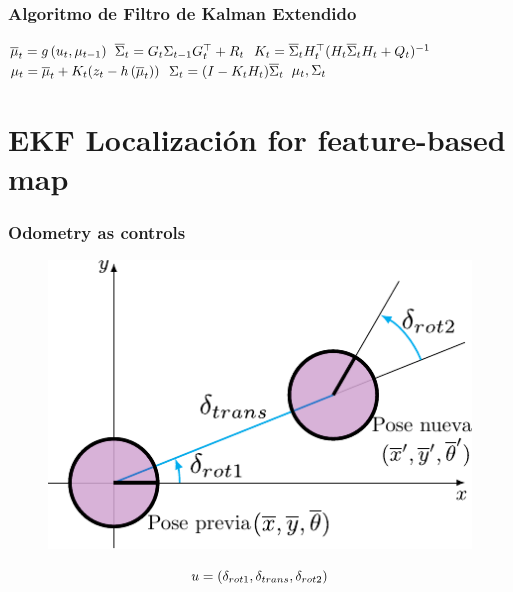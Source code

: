 \begin{frame}
    \frametitle{Algoritmo de Filtro de Kalman Extendido}
    
    \begin{algorithmic}[1]
        \State $\overline{\mu}_{t} = g\left( u_{t}, \mu_{t-1} \right)$
        \State $\overline{\Sigma}_{t} = G_{t} \Sigma_{t-1} G_{t}^{\top}+R_{t}$
        \Statex
        \State $K_{t} = \overline{\Sigma}_{t} H_{t}^{\top} (H_{t} \overline{\Sigma}_{t}  H_{t} + Q_{t})^{-1} $
        \State $\mu_{t} = \overline{\mu}_{t} + K_{t} (z_{t} - h\left( \overline{\mu}_{t} \right))$
        \State $\Sigma_{t} =  (I - K_{t} H_{t}) \overline{\Sigma}_{t}$
        \State \Return $\mu_{t}, \Sigma_{t}$
    \EndProcedure
    \end{algorithmic}
\end{frame}

\section{EKF Localización for feature-based map}

\begin{frame}
    \frametitle{Odometry as controls}
    
       \begin{figure}[!h]
        \includegraphics[width=0.6\columnwidth]{./images/odometry_as_controls.pdf}
    \end{figure}

    \begin{equation*}
        u = (\delta_{rot1}, \delta_{trans}, \delta_{rot2})
    \end{equation*}
    
\end{frame}

